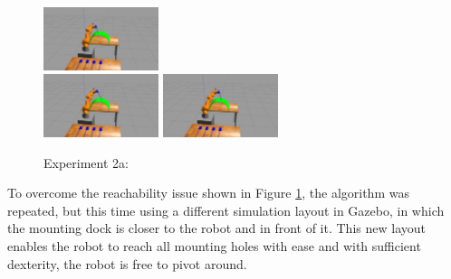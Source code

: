 \begin{center}
\begin{figure}[H]
\includegraphics[width=0.3\textwidth]{images/robot_planner2/robot_planner2_6}\\
\includegraphics[width=0.3\textwidth]{images/robot_planner2/robot_planner2_7}
\includegraphics[width=0.3\textwidth]{images/robot_planner2/robot_planner2_8}\\
\caption{Experiment 2a:}
\label{experiment-robot-planner2a}
\end{figure}
\end{center}

To overcome the reachability issue shown in Figure \ref{experiment-robot-planner2a}, the algorithm was repeated, but this time using a different simulation layout 
in Gazebo, in which the mounting dock is closer to the robot and in front of it. This new layout enables the robot to reach all mounting holes with ease and 
with sufficient dexterity, the robot is free to pivot around.

